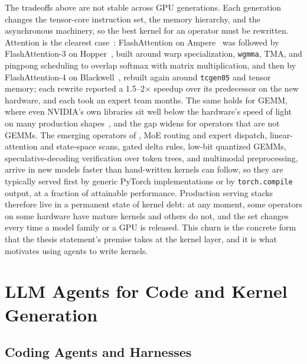 The tradeoffs above are not stable across GPU generations.
Each generation changes the tensor-core instruction set, the memory hierarchy, and the asynchronous machinery, so the best kernel for an operator must be rewritten.
Attention is the clearest case~\cite{miao2023towards}: FlashAttention on Ampere~\cite{flashattention,dao2024flashattention2} was followed by FlashAttention-3 on Hopper~\cite{shah2024flashattention3}, built around warp specialization, \texttt{wgmma}, TMA, and pingpong scheduling to overlap softmax with matrix multiplication, and then by FlashAttention-4 on Blackwell~\cite{zadouri2026flashattention4}, rebuilt again around \texttt{tcgen05} and tensor memory; each rewrite reported a 1.5--2$\times$ speedup over its predecessor on the new hardware, and each took an expert team months.
The same holds for GEMM, where even NVIDIA's own libraries sit well below the hardware's speed of light on many production shapes~\cite{solexecbench}, and the gap widens for operators that are not GEMMs.
The emerging operators of , MoE routing and expert dispatch, linear-attention and state-space scans, gated delta rules, low-bit quantized GEMMs, speculative-decoding verification over token trees, and multimodal preprocessing, arrive in new models faster than hand-written kernels can follow, so they are typically served first by generic PyTorch implementations or by \texttt{torch.compile} output, at a fraction of attainable performance.
Production serving stacks therefore live in a permanent state of kernel debt: at any moment, some operators on some hardware have mature kernels and others do not, and the set changes every time a model family or a GPU is released.
This churn is the concrete form that the thesis statement's premise takes at the kernel layer, and it is what motivates using agents to write kernels.

\section{LLM Agents for Code and Kernel Generation}
\label{background:sec:kernelagents}

\subsection{Coding Agents and Harnesses}
\label{background:subsec:coding_agents}

